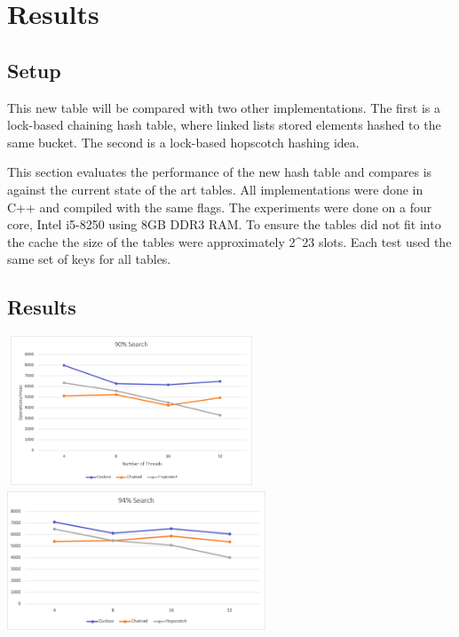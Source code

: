 \documentclass{article}
\begin{document}
\section[Results]{Results}
\subsection{Setup}
This new table will be compared with two other implementations. The first is a lock-based chaining hash table, where
linked lists stored elements hashed to the same bucket. The second is a lock-based hopscotch hashing idea.


\bigskip

This section evaluates the performance of the new hash table and compares is against the current state of the art
tables. All implementations were done in C++ and compiled with the same flags. The experiments were done on a four
core, Intel i5-8250 using 8GB DDR3 RAM. To ensure the tables did not fit into the cache the size of the tables were
approximately 2\^{}23 slots. Each test used the same set of keys for all tables. 

\subsection{Results}
 \includegraphics[width=2.9165in,height=1.7453in]{Report-img009.png} 
\includegraphics[width=3.0291in,height=1.6783in]{Report-img010.png} 


\bigskip
\end{document}
